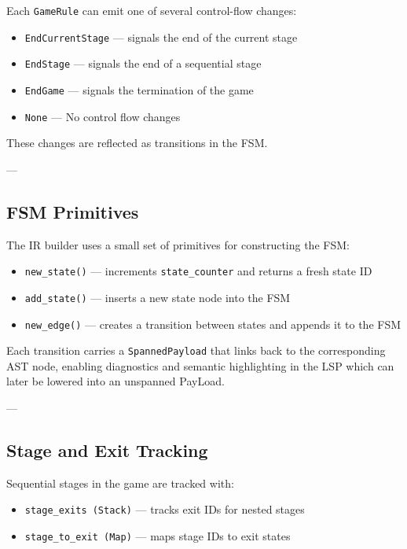 \documentclass[a4paper,11pt]{article}
\begin{document}
Each \texttt{GameRule} can emit one of several control-flow changes:

\begin{itemize}
    \item \texttt{EndCurrentStage} — signals the end of the current stage
    \item \texttt{EndStage} — signals the end of a sequential stage
    \item \texttt{EndGame} — signals the termination of the game
    \item \texttt{None} — No control flow changes 
\end{itemize}

These changes are reflected as transitions in the FSM.

---

\subsection{FSM Primitives}

The IR builder uses a small set of primitives for constructing the FSM:

\begin{itemize}
    \item \texttt{new\_state()} — increments \texttt{state\_counter} and returns a fresh state ID
    \item \texttt{add\_state()} — inserts a new state node into the FSM
    \item \texttt{new\_edge()} — creates a transition between states and appends it to the FSM
\end{itemize}

Each transition carries a \texttt{SpannedPayload} that links back to the corresponding
AST node, enabling diagnostics and semantic highlighting in the LSP which can later be lowered
into an unspanned PayLoad.

---

\subsection{Stage and Exit Tracking}

Sequential stages in the game are tracked with:

\begin{itemize}
    \item \texttt{stage\_exits (Stack)} — tracks exit IDs for nested stages
    \item \texttt{stage\_to\_exit (Map)} — maps stage IDs to exit states
\end{itemize}
\end{document}
